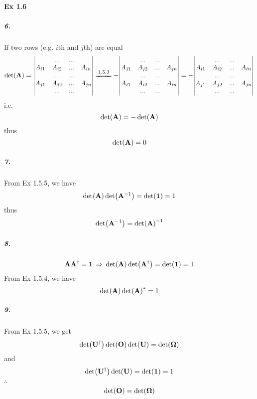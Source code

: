 \documentclass[a4paper]{article}
\DeclareMathOperator{\dra}{\Rightarrow}
\newcommand{\ex}[1]{\paragraph{Ex #1}}
\newcommand{\subex}[1]{\subparagraph{#1}}
\newcommand{\iden}{{\large \bm{1}}}
\numberwithin{equation}{subsection}
\begin{document}
\ex{1.6}
\subex{6.}
If two rows (e.g. $ i $th and $ j $th) are equal
\begin{equation}\label{key}
\det(\vb{A}) = \mqty|  & ... & ... & \\
      A_{i1} & A_{i2} & ... & A_{in}\\
        & ... & ... & \\
      A_{j1} & A_{j2} & ... & A_{jn}\\
        & ... & ... & \\|
\xlongequal{1.5.3} -\mqty|  & ... & ... & \\
A_{j1} & A_{j2} & ... & A_{jn}\\
& ... & ... & \\
A_{i1} & A_{i2} & ... & A_{in}\\
& ... & ... & \\|
= - \mqty|  & ... & ... & \\
A_{i1} & A_{i2} & ... & A_{in}\\
& ... & ... & \\
A_{j1} & A_{j2} & ... & A_{jn}\\
& ... & ... & \\|
\end{equation}
i.e.
\begin{equation}\label{key}
\det(\vb{A}) = -\det(\vb{A})
\end{equation}
thus
\begin{equation}\label{key}
\det(\vb{A}) = 0
\end{equation}
\subex{7.}
From Ex 1.5.5, we have
\begin{equation}\label{key}
\det(\vb{A})\det(\vb{A}^{-1}) = \det(\iden) = 1
\end{equation}
thus
\begin{equation}\label{key}
\det(\vb{A}^{-1}) = \det(\vb{A})^{-1}
\end{equation}
\subex{8.}
\begin{equation}\label{key}
\vb{A}\vb{A}^\dagger = \iden \;\dra\; \det(\vb{A})\det(\vb{A}^\dagger) = \det(\iden) = 1
\end{equation}
From Ex 1.5.4, we have
\begin{equation}\label{key}
\det(\vb{A})\det(\vb{A})^* = 1
\end{equation}
\subex{9.}
From Ex 1.5.5, we get
\begin{equation}\label{key}
\det(\vb{U}^\dagger)\det(\vb{O})\det(\vb{U}) = \det(\bm\Omega)
\end{equation}
and
\begin{equation}\label{key}
\det(\vb{U}^\dagger)\det(\vb{U}) = \det(\iden) = 1
\end{equation}
$ \therefore $
\begin{equation}\label{key}
\det(\vb{O}) = \det(\bm\Omega)
\end{equation}
\end{document}
